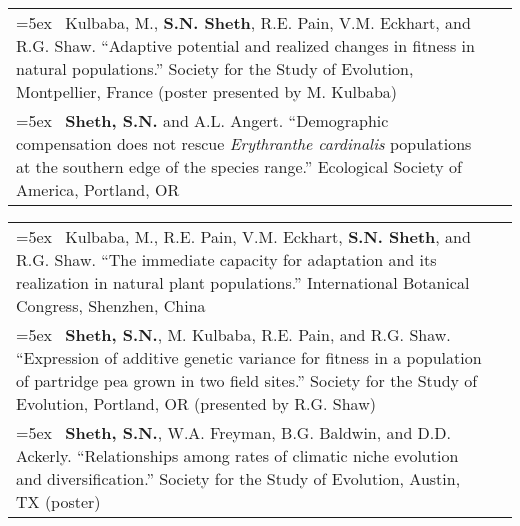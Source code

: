\documentclass[11pt,english]{article}\usepackage[]{graphicx}\usepackage[]{color}
\providecommand{\tabularnewline}{\\}
\begin{document}
\begin{tabularx}{\textwidth}{@{}>{\raggedright}p{5.25in} >{\raggedleft}X@{}}
\hangindent=5ex \ Kulbaba, M., \textbf{S.N. Sheth}, R.E. Pain, V.M. Eckhart, and R.G. Shaw. ``Adaptive potential and realized changes in fitness in natural populations.'' Society for the Study of Evolution, Montpellier, France (poster presented by M. Kulbaba) & 2018 \tabularnewline

\hangindent=5ex \ \textbf{Sheth, S.N.} and A.L. Angert. ``Demographic compensation does not rescue \textit{Erythranthe cardinalis} populations at the southern edge of the species range.'' Ecological Society of America, Portland, OR & 2017 \tabularnewline

\end{tabularx}

\renewcommand{\arraystretch}{1.2}
\begin{tabularx}{\textwidth}{@{}>{\raggedright}p{5.25in} >{\raggedleft}X@{}}

\hangindent=5ex \ Kulbaba, M., R.E. Pain, V.M. Eckhart, \textbf{S.N. Sheth}, and R.G. Shaw. ``The immediate capacity for adaptation and its realization in natural plant populations.'' International Botanical Congress, Shenzhen, China & 2017 \tabularnewline

\hangindent=5ex \ \textbf{Sheth, S.N.}, M. Kulbaba, R.E. Pain, and R.G. Shaw. ``Expression of additive genetic variance for fitness in a population of partridge pea grown in two field sites.'' Society for the Study of Evolution, Portland, OR (presented by R.G. Shaw) & 2017 \tabularnewline

\hangindent=5ex \ \textbf{Sheth, S.N.}, W.A. Freyman, B.G. Baldwin, and D.D. Ackerly. ``Relationships among rates of climatic niche evolution and diversification.'' Society for the Study of Evolution, Austin, TX (poster) & 2016 \tabularnewline


\end{tabularx}
\end{document}
